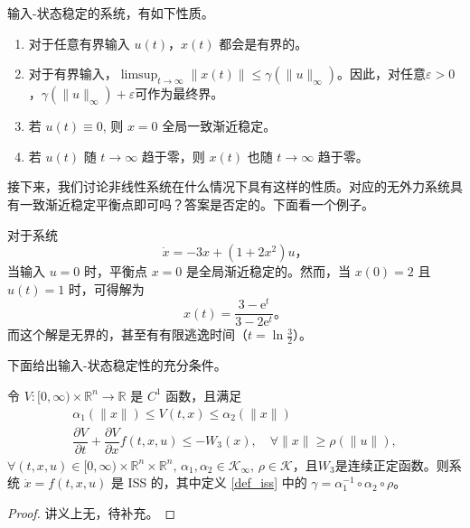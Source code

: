 \begin{note}
    输入-状态稳定的系统，有如下性质。
    \begin{enumerate}
        \item 对于任意有界输入 $u (t)$，$x (t)$ 都会是有界的。
        \item 对于有界输入，$\limsup_{t\to\infty}\|x(t)\|\leq\gamma(\|u\|_\infty)$。因此，对任意$\varepsilon>0$，$\gamma(\|u\|_\infty)+\varepsilon$可作为最终界。
        \item 若 $u (t) \equiv 0$, 则 $x = 0$ 全局一致渐近稳定。
        \item 若 $u (t)$ 随 $t \rightarrow \infty$ 趋于零，则 $x(t)$ 也随 $t \to \infty$ 趋于零。
    \end{enumerate}
\end{note}

接下来，我们讨论非线性系统在什么情况下具有这样的性质。对应的无外力系统具有一致渐近稳定平衡点即可吗？答案是否定的。下面看一个例子。

\begin{example}
    对于系统
    \[
        \dot{x} = -3x + (1 + 2 x^2) u \text{，}
    \]
    当输入 $u = 0$ 时，平衡点 $x = 0$ 是全局渐近稳定的。然而，当 $x(0) = 2$ 且 $u(t) = 1$ 时，可得解为
    \[
        x(t) = \dfrac{3 - \mathrm{e}^t}{3 - 2 \mathrm{e}^t} \text{。}
    \]
    而这个解是无界的，甚至有有限逃逸时间（$t = \ln\frac{3}{2}$）。
\end{example}

下面给出输入-状态稳定性的充分条件。

\begin{theorem}[输入-状态稳定性的充分条件]
    令 $V : [ 0, \infty ) \times \mathbb{R}^n \to \mathbb{R}$ 是 $C^1$ 函数，且满足
    \begin{gather*}
        \alpha_1 (\| x \|) \leq V(t, x) \leq \alpha_2 (\| x \|) \\
        \dfrac{\partial V}{\partial t} + \dfrac{\partial V}{\partial x} f(t, x, u) \leq -W_3(x), \quad \forall \| x \| \geq \rho (\|u\|),
    \end{gather*}
    $\forall (t, x, u) \in [ 0, \infty ) \times \mathbb{R}^n \times \mathbb{R}^n,\, \alpha_1, \alpha_2 \in \mathcal{K}_\infty,\, \rho \in \mathcal{K}$，且$W_3$是连续正定函数。则系统 $\dot{x} = f(t, x, u)$ 是 ISS 的，其中定义 \ref{def_iss} 中的 $\gamma = \alpha_1^{-1} \circ \alpha_2 \circ \rho$。
\end{theorem}

\begin{proof}
    讲义上无，待补充。%
\end{proof}


